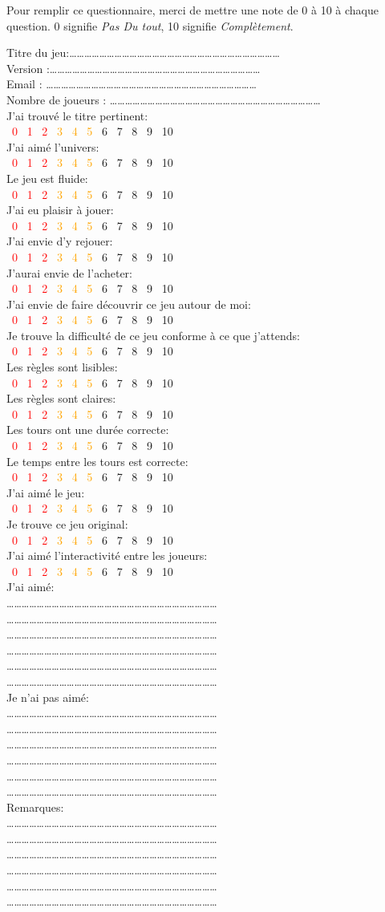 \documentclass[11pt,a4paper]{letter}
\newcommand\checkbox[1]{%
    \Square\ #1\quad%
}
\newcommand{\note}[1]{
#1\\
\textcolor{red}{\checkbox{0}} \textcolor{red}{\checkbox{1}} \textcolor{red}{\checkbox{2}}  \textcolor{orange}	{\checkbox{3}}  \textcolor{orange}{\checkbox{4}}  \textcolor{orange}{\checkbox{5}} 	\checkbox{6} \checkbox{7} \textcolor{vert}{\checkbox{8}} \textcolor{vert}{\checkbox{9}} 	\textcolor{vert}{\checkbox{10}}\\
}
\newcommand{\points}{…………………………………………………………………………\\}
\newcommand{\pointsmultilines}{\\\points\points\points\points\points\points}
\begin{document}
Pour remplir ce questionnaire, merci de mettre une note de 0 à 10 à chaque question. 0 signifie \textit{Pas Du tout}, 10 signifie \textit{Complètement}.

Titre du jeu:\points
Version :\points
Email : \points
Nombre de joueurs : \points

\note{J'ai trouvé le titre pertinent:}
\note{J'ai aimé l'univers:}
\note{Le jeu est fluide:}
\note{J'ai eu plaisir à jouer:}
\note{J'ai envie d'y rejouer:}
\note{J'aurai envie de l'acheter:}
\note{J'ai envie de faire découvrir ce jeu autour de moi:}
\note{Je trouve la difficulté de ce jeu conforme à ce que j'attends:}
\note{Les règles sont lisibles:}
\note{Les règles sont claires:}
\note{Les tours ont une durée correcte:}
\note{Le temps entre les tours est correcte:}
\note{J'ai aimé le jeu:}
\note{Je trouve ce jeu original:}
\note{J'ai aimé l'interactivité entre les joueurs:}
J'ai aimé: \pointsmultilines
Je n'ai pas aimé:\pointsmultilines
Remarques:\pointsmultilines
\end{document}
